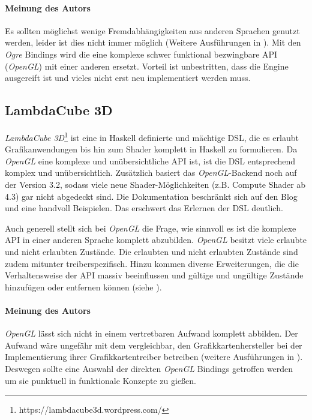 \paragraph{Meinung des Autors} Es sollten möglichst wenige Fremdabhängigkeiten aus anderen Sprachen genutzt werden, leider ist dies nicht immer möglich (Weitere Ausführungen in ). Mit den \textit{Ogre} Bindings wird die eine komplexe schwer funktional bezwingbare \acs{API} (\textit{OpenGL}) mit einer anderen ersetzt. Vorteil ist unbestritten, dass die Engine ausgereift ist und vieles nicht erst neu implementiert werden muss.

\subsection{LambdaCube 3D}

\textit{LambdaCube 3D}\footnote{https://lambdacube3d.wordpress.com/} ist eine in Haskell definierte und mächtige \ac{DSL}, die es erlaubt Grafikanwendungen bis hin zum Shader komplett in Haskell zu formulieren. Da \textit{OpenGL} eine komplexe und unübersichtliche \acs{API} ist, ist die \ac{DSL} entsprechend komplex und unübersichtlich. Zusätzlich basiert das \textit{OpenGL}-Backend noch auf der Version 3.2, sodass viele neue Shader-Möglichkeiten (z.B. Compute Shader ab 4.3) gar nicht abgedeckt sind. Die Dokumentation beschränkt sich auf den Blog und eine handvoll Beispielen. Das erschwert das Erlernen der DSL deutlich.

Auch generell stellt sich bei \textit{OpenGL} die Frage, wie sinnvoll es ist die komplexe \acs{API} in einer anderen Sprache komplett abzubilden. \textit{OpenGL} besitzt viele erlaubte und nicht erlaubten Zustände. Die erlaubten und nicht erlaubten Zustände sind zudem mitunter treiberspezifisch. Hinzu kommen diverse Erweiterungen, die die Verhaltensweise der \acs{API} massiv beeinflussen und gültige und ungültige Zustände hinzufügen oder entfernen können (siehe ).

\paragraph{Meinung des Autors} \textit{OpenGL} lässt sich nicht in einem vertretbaren Aufwand komplett abbilden. Der Aufwand wäre ungefähr mit dem vergleichbar, den Grafikkartenhersteller bei der Implementierung ihrer Grafikkartentreiber betreiben (weitere Ausführungen in ). Deswegen sollte eine Auswahl der direkten \textit{OpenGL} Bindings getroffen werden um sie punktuell in funktionale Konzepte zu gießen.


